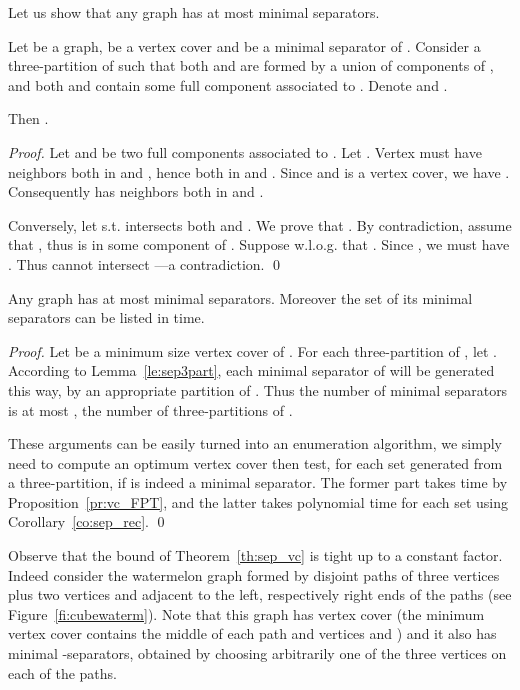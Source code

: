 \documentclass{llncs}
\begin{document}
Let us show that any graph  has at most  minimal separators.

\begin{lemma}\label{le:sep3part}
Let  be a graph,  be a vertex cover and  be a minimal separator of . Consider a three-partition  of  such that 
both  and  are formed by a union of components of , and both  and  contain some full component associated to .
Denote  and . 

Then .
\end{lemma}
\begin{proof}
Let  and  be two full components associated to .
Let . Vertex  must have neighbors both in  and , hence both in  and . Since  and  is a vertex cover, we have . Consequently  has neighbors both in   and .

Conversely, let  s.t.  intersects both  and . We prove that . By contradiction, assume that , thus  is in some component  of . Suppose w.l.o.g. that . Since , we must have . Thus  cannot intersect ---a contradiction.
\qed
\end{proof}

\begin{theorem}\label{th:sep_vc}
Any graph  has at most  minimal separators. Moreover the set of its minimal separators can be listed in  time.
\end{theorem}
\begin{proof}
Let  be a minimum size vertex cover of . For each three-partition  of , let . According to Lemma~\ref{le:sep3part}, each minimal separator of  will be generated this way, by an appropriate partition  of . Thus the number of minimal separators is at most , the number of three-partitions of .

These arguments can be easily turned into an enumeration algorithm, we simply need to compute an optimum vertex cover then test, for each set  generated from a three-partition, if  is indeed a minimal separator. The former part takes  time by Proposition~\ref{pr:vc_FPT}, and the latter takes polynomial time for each set  using Corollary~\ref{co:sep_rec}.
\qed
\end{proof}
 
Observe that the bound of Theorem~\ref{th:sep_vc} is tight up to a constant factor. Indeed consider the watermelon graph   formed by  disjoint paths of three vertices plus two vertices  and  adjacent to the left, respectively right ends of the paths (see Figure~\ref{fi:cubewaterm}). Note that this graph has vertex cover  (the minimum vertex cover contains the middle of each path and vertices  and ) and it also has  minimal -separators, obtained by choosing arbitrarily one of the three vertices on each of the  paths. 
\end{document}
